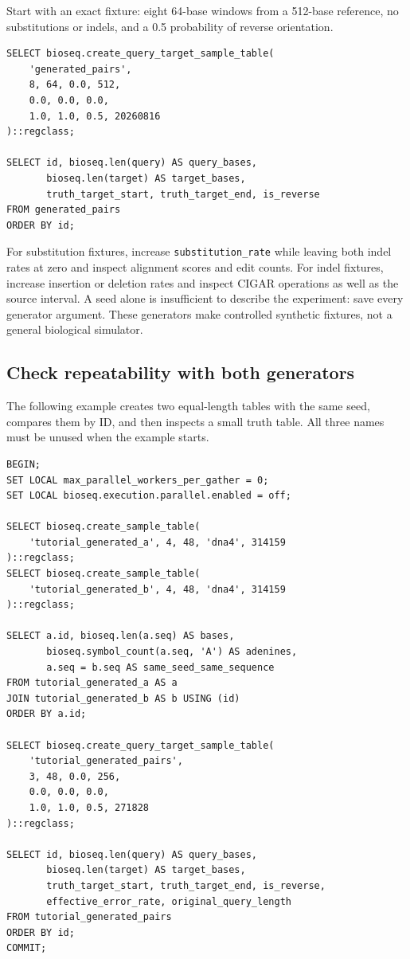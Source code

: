 Start with an exact fixture: eight 64-base windows from a 512-base reference,
no substitutions or indels, and a 0.5 probability of reverse orientation.
\par\noindent\begin{minipage}{\linewidth}
\begin{lstlisting}[style=bioseq-appendix-sql]
SELECT bioseq.create_query_target_sample_table(
    'generated_pairs',
    8, 64, 0.0, 512,
    0.0, 0.0, 0.0,
    1.0, 1.0, 0.5, 20260816
)::regclass;

SELECT id, bioseq.len(query) AS query_bases,
       bioseq.len(target) AS target_bases,
       truth_target_start, truth_target_end, is_reverse
FROM generated_pairs
ORDER BY id;
\end{lstlisting}
\end{minipage}

For substitution fixtures, increase \texttt{substitution\_rate} while
leaving both indel rates at zero and inspect alignment scores and edit counts.
For indel fixtures, increase insertion or deletion rates and inspect CIGAR
operations as well as the source interval. A seed alone is insufficient to
describe the experiment: save every generator argument. These generators
make controlled synthetic fixtures, not a general biological simulator.

\subsection{Check repeatability with both generators}

The following example creates two equal-length tables with the same seed,
compares them by ID, and then inspects a small truth table. All three names
must be unused when the example starts.
\par\noindent\begin{minipage}{\linewidth}
\begin{lstlisting}[style=bioseq-appendix-sql]
BEGIN;
SET LOCAL max_parallel_workers_per_gather = 0;
SET LOCAL bioseq.execution.parallel.enabled = off;

SELECT bioseq.create_sample_table(
    'tutorial_generated_a', 4, 48, 'dna4', 314159
)::regclass;
SELECT bioseq.create_sample_table(
    'tutorial_generated_b', 4, 48, 'dna4', 314159
)::regclass;

SELECT a.id, bioseq.len(a.seq) AS bases,
       bioseq.symbol_count(a.seq, 'A') AS adenines,
       a.seq = b.seq AS same_seed_same_sequence
FROM tutorial_generated_a AS a
JOIN tutorial_generated_b AS b USING (id)
ORDER BY a.id;

SELECT bioseq.create_query_target_sample_table(
    'tutorial_generated_pairs',
    3, 48, 0.0, 256,
    0.0, 0.0, 0.0,
    1.0, 1.0, 0.5, 271828
)::regclass;

SELECT id, bioseq.len(query) AS query_bases,
       bioseq.len(target) AS target_bases,
       truth_target_start, truth_target_end, is_reverse,
       effective_error_rate, original_query_length
FROM tutorial_generated_pairs
ORDER BY id;
COMMIT;
\end{lstlisting}
\end{minipage}

